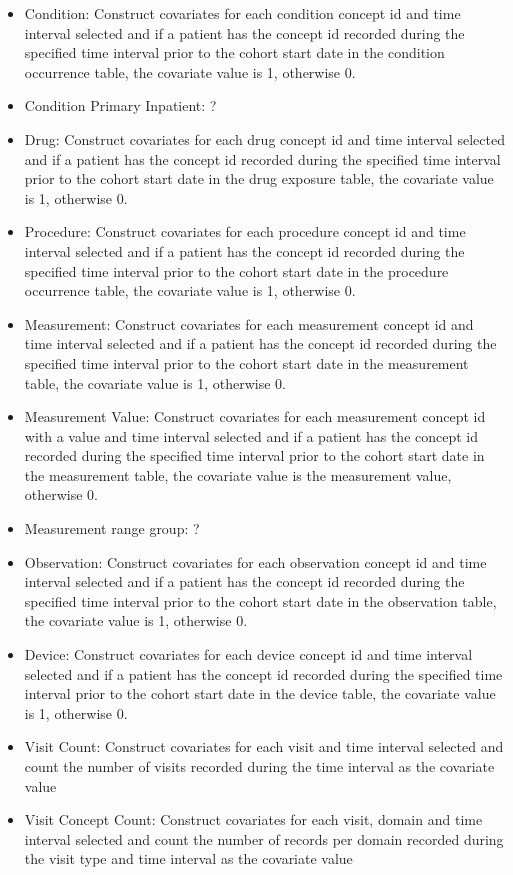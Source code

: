 \documentclass[11pt]{book}
\providecommand{\tightlist}{%
  \setlength{\itemsep}{0pt}\setlength{\parskip}{0pt}}
\begin{document}
\begin{itemize}
\tightlist
\item
  Condition: Construct covariates for each condition concept id and time
  interval selected and if a patient has the concept id recorded during
  the specified time interval prior to the cohort start date in the
  condition occurrence table, the covariate value is 1, otherwise 0.
\item
  Condition Primary Inpatient: ?
\item
  Drug: Construct covariates for each drug concept id and time interval
  selected and if a patient has the concept id recorded during the
  specified time interval prior to the cohort start date in the drug
  exposure table, the covariate value is 1, otherwise 0.
\item
  Procedure: Construct covariates for each procedure concept id and time
  interval selected and if a patient has the concept id recorded during
  the specified time interval prior to the cohort start date in the
  procedure occurrence table, the covariate value is 1, otherwise 0.
\item
  Measurement: Construct covariates for each measurement concept id and
  time interval selected and if a patient has the concept id recorded
  during the specified time interval prior to the cohort start date in
  the measurement table, the covariate value is 1, otherwise 0.
\item
  Measurement Value: Construct covariates for each measurement concept
  id with a value and time interval selected and if a patient has the
  concept id recorded during the specified time interval prior to the
  cohort start date in the measurement table, the covariate value is the
  measurement value, otherwise 0.
\item
  Measurement range group: ?
\item
  Observation: Construct covariates for each observation concept id and
  time interval selected and if a patient has the concept id recorded
  during the specified time interval prior to the cohort start date in
  the observation table, the covariate value is 1, otherwise 0.
\item
  Device: Construct covariates for each device concept id and time
  interval selected and if a patient has the concept id recorded during
  the specified time interval prior to the cohort start date in the
  device table, the covariate value is 1, otherwise 0.
\item
  Visit Count: Construct covariates for each visit and time interval
  selected and count the number of visits recorded during the time
  interval as the covariate value
\item
  Visit Concept Count: Construct covariates for each visit, domain and
  time interval selected and count the number of records per domain
  recorded during the visit type and time interval as the covariate
  value
\end{itemize}
\end{document}
